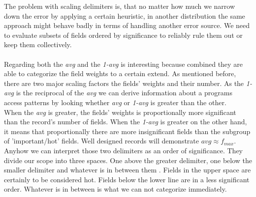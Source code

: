 The problem with scaling delimiters is, that no matter how much we narrow down the error by applying a certain heuristic, in another distribution the same approach might behave badly in terms of handling another error source. We need to evaluate subsets of fields ordered by significance to reliably rule them out or keep them collectively.\\\\
Regarding both the \textit{avg} and the \textit{1-avg} is interesting because combined they are able to categorize the field weights to a certain extend. As mentioned before, there are two major scaling factors the fields' weights and their number. As the \textit{1-avg} is the reciprocal of the \textit{avg} we can derive information about a programs access patterns by looking whether \textit{avg} or \textit{1-avg} is greater than the other.\\
When the \textit{avg} is greater, the fields' weights is proportionally more significant than the record's number of fields. When the \textit{1-avg} is greater on the other hand, it means that proportionally there are more insignificant fields than the subgroup of 'important/hot' fields. Well designed records will demonstrate $avg\approx f_{max}$. Anyhow we can interpret those two delimiters as an order of significance. They divide our scope into three spaces. One above the greater delimiter, one below the smaller delimiter and whatever is in between them . Fields in the upper space are certainly to be considered hot. Fields below the lower line are in a less significant order. Whatever is in between is what we can not categorize immediately. 

